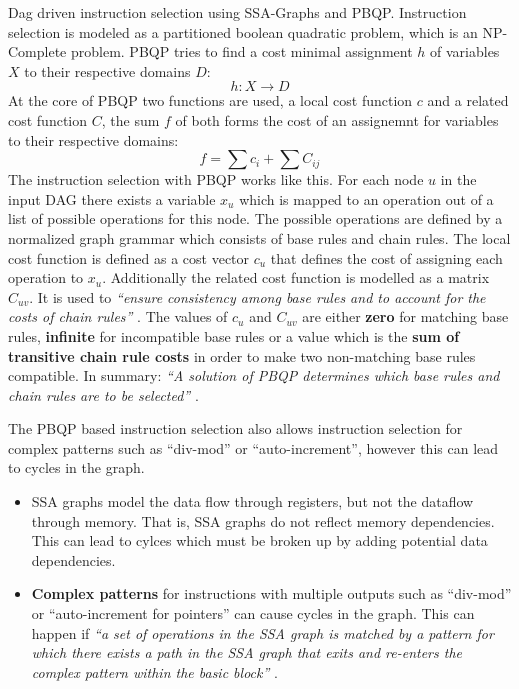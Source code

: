 \documentclass[a4paper,10pt]{article}
\begin{document}
\begin{itemize}
       Dag driven instruction selection using SSA-Graphs and PBQP. Instruction selection is modeled as a partitioned boolean quadratic 
       problem, which is 
       an NP-Complete problem. PBQP tries to find a cost minimal assignment $h$ of variables $X$ to their respective domains $D$:
       \[ h: X \rightarrow D\]
       At the core of PBQP two functions are used, a local cost function $c$ and a related cost function $C$, the sum $f$ of both forms 
       the cost of an assignemnt for variables to their respective domains:
       \[ f = \sum c_i + \sum{C_{ij}} \]
       The instruction selection with PBQP works like this. For each node $u$ in the input DAG there exists a variable $x_u$ which is 
       mapped to an operation out of a list of possible operations for this node. The possible operations are defined by a normalized 
       graph 
       grammar which consists of base rules and chain rules. The local cost function is defined as a 
       cost vector $c_u$ that defines the cost of assigning each operation to $x_u$. Additionally the related cost function is modelled as 
       a matrix $C_{uv}$. It is used to \textit{``ensure consistency among base rules and to account for the costs of chain rules''}
       \cite{pbqp-instruction-selection}. The values of $c_u$ and $C_{uv}$ are either \textbf{zero} for matching base rules, 
       \textbf{infinite} for incompatible 
       base rules or a value which is the \textbf{sum of transitive chain rule costs} in order to make two non-matching base rules 
       compatible. In summary: \textit{``A solution of PBQP determines which base rules and chain rules are to be selected''}
       \cite{pbqp-instruction-selection}.

The PBQP based instruction selection also allows instruction selection for complex patterns such as ``div-mod'' or ``auto-increment'', 
however this can lead to cycles in the graph.
    \begin{itemize}
    \item SSA graphs model the data flow through registers, but not the dataflow through memory. That is, SSA graphs do not reflect memory
          dependencies. This can lead to cylces which must be broken up by adding potential data dependencies.
    \item \textbf{Complex patterns} for instructions with multiple outputs such as ``div-mod'' or ``auto-increment for pointers'' can 
          cause cycles in the graph. This can happen if \textit{``a set of operations in the SSA graph is matched by a pattern for which 
          there exists a path in the SSA graph that exits and re-enters the complex pattern within the basic block''} \cite{pbqp-instruction-selection}.
    \end{itemize}
\end{itemize}
\end{document}

